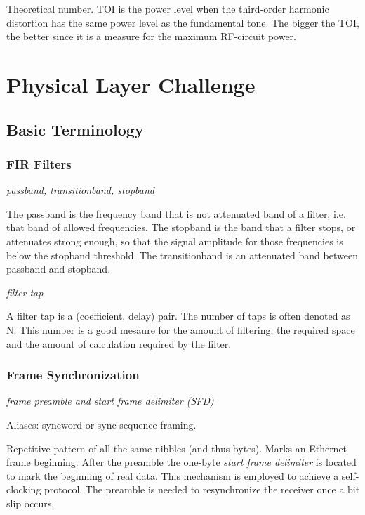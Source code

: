 \documentclass{article}
\begin{document}
Theoretical number. TOI is the power level when the third-order harmonic distortion has the same power level as the fundamental tone. The bigger the TOI, the better since it is a measure for the maximum RF-circuit power.

\section{Physical Layer Challenge}

\subsection{Basic Terminology}

\subsubsection{FIR Filters}

\emph{passband, transitionband, stopband}

The passband is the frequency band that is not attenuated band of a filter, i.e. that band of allowed frequencies. The stopband is the band that a filter stops, or attenuates strong enough, so that the signal amplitude for those frequencies is below the stopband threshold. The transitionband is an attenuated band between passband and stopband.  

\bigskip

\emph{filter tap}

A filter tap is a (coefficient, delay) pair. The number of taps is often denoted as N. This number is a good mesaure for the amount of filtering, the required space and the amount of calculation required by the filter. 

\subsubsection{Frame Synchronization}

\emph{frame preamble and start frame delimiter (SFD)}

Aliases: syncword or sync sequence framing.

Repetitive pattern of all the same nibbles (and thus bytes). Marks an Ethernet frame beginning. After the preamble the one-byte \emph{start frame delimiter} is located to mark the beginning of real data. This mechanism is employed to achieve a self-clocking protocol. The preamble is needed to resynchronize the receiver once a bit slip occurs.
\end{document}
